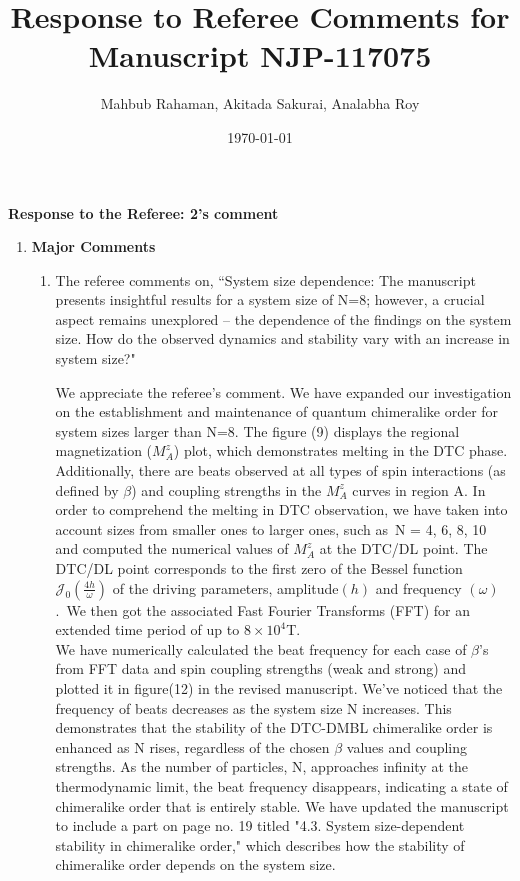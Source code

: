 \documentclass[10pt,
superscriptaddress,
amsmath,amssymb,showkeys,
aps, 
prb,
]{revtex4-2}
\newcommand{\response}[1]{{\color{black}#1}} %
\newcommand{\comment}[1]{{\color{blue}#1}} %
\begin{document}

\title{Response to Referee Comments for Manuscript NJP-117075}
\author{Mahbub Rahaman, Akitada Sakurai, Analabha Roy}
\date{\today}

\maketitle

\vspace{1em}

\noindent \textbf{Response to the Referee: 2's comment}
\begin{enumerate}
	\item {\bf Major Comments}
	\begin{enumerate}
		\item The referee comments on, \comment{``System size dependence: The manuscript presents insightful results for a system size
				of N=8; however, a crucial aspect remains unexplored – the dependence of the
				findings on the system size. How do the observed dynamics and stability vary with an
				increase in system size?"}\\
		
		\response{
			We appreciate the referee's comment. We have expanded our investigation on the establishment and maintenance of quantum chimeralike order for system sizes larger than N=8. The figure (9) displays the regional magnetization ($M^z_A$) plot, which demonstrates melting in the DTC phase. Additionally, there are beats observed at all types of spin interactions (as defined by $\beta$) and coupling strengths in the $M^z_A$ curves in region A. In order to comprehend the melting in DTC observation, we have taken into account sizes from smaller ones to larger ones, such as N = 4, 6, 8, 10 and computed the numerical values of $M^z_A$ at the DTC/DL point. The DTC/DL point corresponds to the first zero of the Bessel function $\mathcal{J}_0\left(\frac{4h}{\omega}\right)$ of the driving parameters, amplitude$(h)$ and frequency $(\omega)$. We then got the associated Fast Fourier Transforms (FFT) for an extended time period of up to $8 \times 10^4$T.   \\		
			
			We have numerically calculated the beat frequency for each case of $\beta$'s from FFT data and spin coupling strengths (weak and strong) and plotted it in figure(12) in the revised manuscript. We've noticed that the frequency of beats decreases as the system size N increases. This demonstrates that the stability of the DTC-DMBL chimeralike order is enhanced as N rises, regardless of the chosen $\beta$ values and coupling strengths. As the number of particles, N, approaches infinity at the thermodynamic limit, the beat frequency disappears, indicating a state of chimeralike order that is entirely stable. We have updated the manuscript to include a part on page no. 19 titled "4.3. System size-dependent stability in chimeralike order," which describes how the stability of chimeralike order depends on the system size.
			
}
\end{enumerate}
\end{enumerate}
\end{document}
